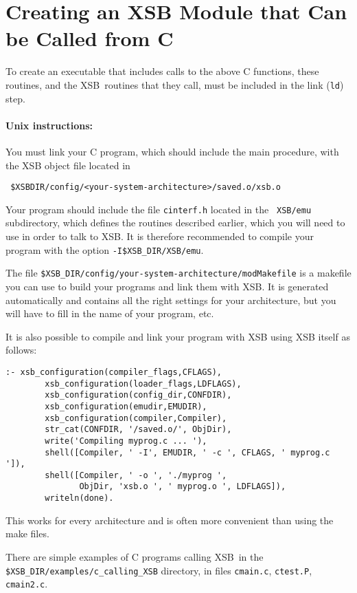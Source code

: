 \section{Creating an XSB Module that Can be Called from C}

To create an executable that includes calls to the above C functions,
these routines, and the XSB\ routines that they call, must be
included in the link ({\tt ld}) step.

\paragraph{Unix instructions:}
You must link your C program, which should include the main procedure, with
the XSB object file located in
\begin{verbatim}
 $XSBDIR/config/<your-system-architecture>/saved.o/xsb.o  
\end{verbatim}
Your program should include the file {\tt cinterf.h} located in the {\tt
  XSB/emu} subdirectory, which defines the routines described earlier,
which you will need to use in order to talk to XSB.  It is therefore
recommended to compile your program with the option
\verb|-I$XSB_DIR/XSB/emu|.

The file {\tt \$XSB\_DIR/config/your-system-architecture/modMakefile} is a
makefile you can use to build your programs and link them with XSB.  It is
generated automatically and contains all the right settings for your
architecture, but you will have to fill in the name of your program, etc.

It is also possible to compile and link your program with XSB using XSB
itself as follows:
\begin{verbatim}
:- xsb_configuration(compiler_flags,CFLAGS),
        xsb_configuration(loader_flags,LDFLAGS),
        xsb_configuration(config_dir,CONFDIR),
        xsb_configuration(emudir,EMUDIR),
        xsb_configuration(compiler,Compiler),
        str_cat(CONFDIR, '/saved.o/', ObjDir),
        write('Compiling myprog.c ... '),
        shell([Compiler, ' -I', EMUDIR, ' -c ', CFLAGS, ' myprog.c ']),
        shell([Compiler, ' -o ', './myprog ',
               ObjDir, 'xsb.o ', ' myprog.o ', LDFLAGS]),
        writeln(done).  
\end{verbatim}
This works for every architecture and is often more convenient than using
the make files.

There are simple examples of C programs calling XSB\ in the
{\tt \$XSB\_DIR/examples/c\_calling\_XSB} directory, in files {\tt cmain.c},
{\tt ctest.P}, {\tt cmain2.c}.

